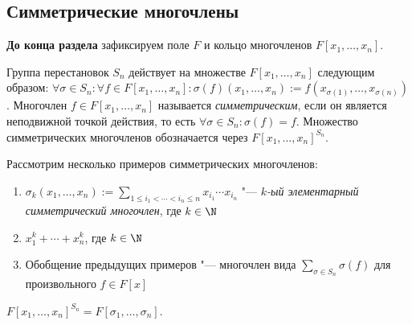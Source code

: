 \subsection{Симметрические многочлены}

\textbf{До конца раздела} зафиксируем поле $F$ и кольцо многочленов $F[x_1, \dotsc, x_n]$.

\begin{definition}
	Группа перестановок $S_n$ действует на множестве $F[x_1, \dotsc, x_n]$ следующим образом: $\forall \sigma \in S_n: \forall f \in F[x_1, \dotsc, x_n]: \sigma(f)(x_1, \dotsc, x_n) := f(x_{\sigma(1)}, \dotsc, x_{\sigma(n)})$. Многочлен $f \in F[x_1, \dotsc, x_n]$ называется \textit{симметрическим}, если он является неподвижной точкой действия, то есть $\forall \sigma \in S_n: \sigma(f) = f$. Множество симметрических многочленов обозначается через $F[x_1, \dotsc, x_n]^{S_n}$.
\end{definition}

\begin{example}
	Рассмотрим несколько примеров симметрических многочленов:
	\begin{enumerate}
		\item $\sigma_k(x_1, \dotsc, x_n) := \sum_{1\le i_1 < \dotsb < i_n \le n}x_{i_1}
		\dotsm x_{i_n}$ "--- \textit{$k$-ый элементарный симметрический многочлен}, где $k \in \N$
		\item $x_1^k + \dotsb + x_n^k$, где $k \in \N$
		\item Обобщение предыдущих примеров "--- многочлен вида $\sum_{\sigma \in S_n}\sigma(f)$ для произвольного $f \in F[x]$
	\end{enumerate}
\end{example}

\begin{theorem}
	$F[x_1, \dotsc, x_n]^{S_n} = F[\sigma_1, \dotsc, \sigma_n]$.
\end{theorem}

